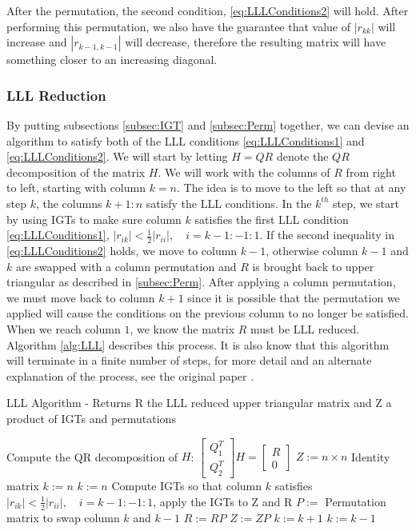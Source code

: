 \documentclass[12pt,Bold,letterpaper]{mcgilletdclass}
\newcommand{\bsmx}{\left[\begin{smallmatrix}}
\newcommand{\esmx}{\end{smallmatrix}\right]}
\newcommand{\vsp}{\vspace{\baselineskip}}
\begin{document}
After the permutation, the second condition, \eqref{eq:LLLConditions2} will hold. After performing this permutation, we also have the guarantee that value of $|r_{kk}|$ will increase and $|r_{k-1,k-1}|$ will decrease, therefore the resulting matrix will have something closer to an increasing diagonal.

\vsp \subsubsection{LLL Reduction}
By putting subsections \ref{subsec:IGT} and \ref{subsec:Perm} together, we can devise an algorithm to satisfy both of the LLL conditions \eqref{eq:LLLConditions1} and \eqref{eq:LLLConditions2}. We will start by letting $H = QR$ denote the $QR$ decomposition of the matrix $H$. We will work with the columns of $R$ from right to left, starting with column $k=n$. The idea is to move to the left so that at any step $k$, the columns $k+1:n$ satisfy the LLL conditions. In the $k^{th}$ step, we start by using IGTs to make sure column $k$ satisfies the first LLL condition \eqref{eq:LLLConditions1}, $|r_{ik}| < \frac{1}{2}|r_{ii}|, \quad i = k-1:-1:1$. If the second inequality in \ref{eq:LLLConditions2} holds, we move to column $k-1$, otherwise column $k-1$ and $k$ are swapped with a column permutation and $R$ is brought back to upper triangular as described in \ref{subsec:Perm}. After applying a column permutation, we must move back to column $k+1$ since it is possible that the permutation we applied will cause the conditions on the previous column to no longer be satisfied. When we reach column $1$, we know the matrix $R$ must be LLL reduced. Algorithm \ref{alg:LLL} describes this process. It is also know that this algorithm will terminate in a finite number of steps, for more detail and an alternate explanation of the process, see the original paper \cite{LenLL82}.

\begin{algorithm}
\caption{LLL Algorithm - Returns R the LLL reduced upper triangular matrix and Z a product of IGTs and permutations}
\label{alg:LLL}
\begin{algorithmic}[1]
\STATE Compute the QR decomposition of $H$: $\bsmx Q_1^T \\ Q_2^T \esmx H= \bsmx R\\ 0 \esmx$
\STATE $Z := n \times n$ Identity matrix
\STATE $k := n$
		\STATE $k := n$	
	\ENDIF
	\STATE Compute IGTs so that column $k$ satisfies $|r_{ik}| < \frac{1}{2}|r_{ii}|, \quad i = k-1:-1:1$, apply the IGTs 		to Z and R
		\STATE $P := $ Permutation matrix to swap column $k$ and $k-1$
		\STATE $R := RP$
		\STATE $Z := ZP$
		\STATE $k := k+1$
	\ELSE
		\STATE $k := k-1$
	\ENDIF
\ENDWHILE
\end{algorithmic}
\end{algorithm}
\end{document}
